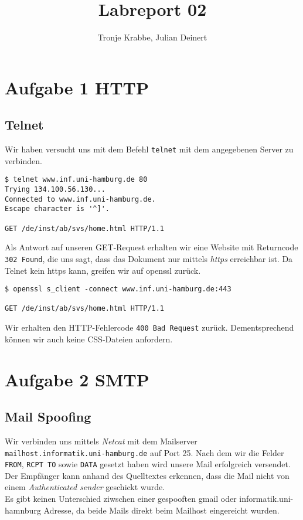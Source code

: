 \documentclass[10pt,a4paper]{article}
\author{Tronje Krabbe, Julian Deinert}
\title{Labreport 02}
\begin{document}
\maketitle
\tableofcontents
\newpage


\section*{Aufgabe 1 HTTP}
\subsection{Telnet}
Wir haben versucht uns mit dem Befehl \texttt{telnet} mit dem angegebenen Server zu verbinden.
\begin{verbatim}
$ telnet www.inf.uni-hamburg.de 80                                                                       
Trying 134.100.56.130...
Connected to www.inf.uni-hamburg.de.
Escape character is '^]'.

GET /de/inst/ab/svs/home.html HTTP/1.1
\end{verbatim}
Als Antwort auf unseren GET-Request erhalten wir eine Website mit Returncode \texttt{302 Found}, die uns sagt, dass das Dokument nur mittels \textit{https} erreichbar ist. Da Telnet kein https kann, greifen wir auf openssl zurück.
\begin{verbatim}
$ openssl s_client -connect www.inf.uni-hamburg.de:443

GET /de/inst/ab/svs/home.html HTTP/1.1

\end{verbatim}
Wir erhalten den HTTP-Fehlercode \texttt{400 Bad Request} zurück. Dementsprechend können wir auch keine CSS-Dateien anfordern.

\setcounter{section}{2}
\setcounter{subsection}{0}
\section*{Aufgabe 2 SMTP}
\subsection{Mail Spoofing}
Wir verbinden uns mittels \textit{Netcat} mit dem Mailserver \texttt{mailhost.informatik.uni-hamburg.de} auf Port 25. Nach dem wir die Felder \texttt{FROM}, \texttt{RCPT TO} sowie \texttt{DATA} gesetzt haben wird unsere Mail erfolgreich versendet.
Der Empfänger kann anhand des Quelltextes erkennen, dass die Mail nicht von einem \textit{Authenticated sender} geschickt wurde.\\
Es gibt keinen Unterschied ziwschen einer gespooften gmail oder informatik.uni-hamnburg Adresse, da beide Mails direkt beim Mailhost eingereicht wurden.
\end{document}
